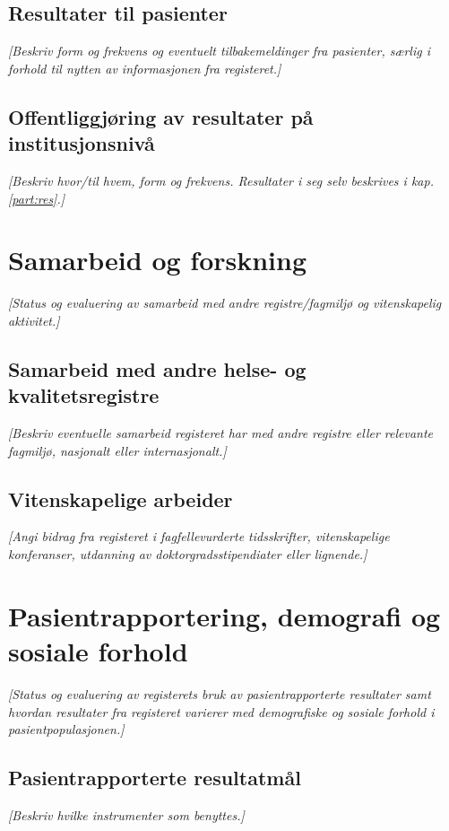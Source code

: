 \documentclass[norsk, a4paper, twocolumn]{report}
\newcommand{\guide}[1] {
	\textit{[\textcolor{guidegray}{#1}]}
	}
\begin{document}
\section{Resultater til pasienter}\label{sec:respas}
\guide{Beskriv form og frekvens og eventuelt tilbakemeldinger fra pasienter,
særlig i forhold til nytten av informasjonen fra registeret.}

\section{Offentliggjøring av resultater på institusjonsnivå}\label{sec:off}
\guide{Beskriv hvor/til hvem, form og frekvens. Resultater i seg selv beskrives i kap. \ref{part:res}.}






\chapter{Samarbeid og forskning}\label{cha:for}
\guide{Status og evaluering av samarbeid med andre registre/fagmiljø og  vitenskapelig aktivitet.}

\section{Samarbeid med andre helse- og kvalitetsregistre}\label{sec:samfag}
\guide{Beskriv eventuelle samarbeid registeret har med andre registre eller relevante fagmiljø, nasjonalt eller internasjonalt.}

\section{Vitenskapelige arbeider}\label{sec:vitarb}
\guide{Angi bidrag fra registeret i fagfellevurderte tidsskrifter,
vitenskapelige konferanser, utdanning av doktorgradsstipendiater eller
lignende.}



\chapter{Pasientrapportering, demografi og sosiale forhold}\label{cha:pas}
\guide{Status og evaluering av registerets bruk av pasientrapporterte
resultater samt
hvordan resultater fra registeret varierer med demografiske og sosiale forhold
i pasientpopulasjonen.}

\section{Pasientrapporterte resultatmål}\label{sec:pasutk}
\guide{Beskriv hvilke instrumenter som benyttes.}
\end{document}
